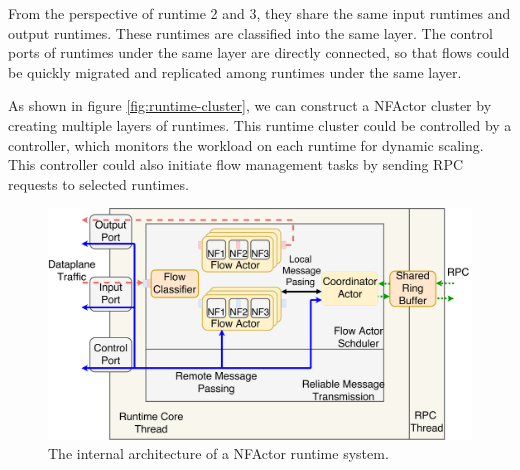 
From the perspective of runtime 2 and 3, they share the same input runtimes and output runtimes. These runtimes are classified into the same layer. The control ports of runtimes under the same layer are directly connected, so that flows could be quickly migrated and replicated among runtimes under the same layer.


As shown in figure \ref{fig:runtime-cluster}, we can construct a NFActor cluster by creating multiple layers of runtimes. This runtime cluster could be controlled by a controller, which monitors the workload on each runtime for dynamic scaling. This controller could also initiate flow management tasks by sending RPC requests to selected runtimes. 

\begin{figure}
		\centering
		\includegraphics[width=\columnwidth]{figure/nfactor-runtime-arch.pdf}

		\caption{The internal architecture of a NFActor runtime system. }
\label{fig:runtime-arch}
\end{figure}
